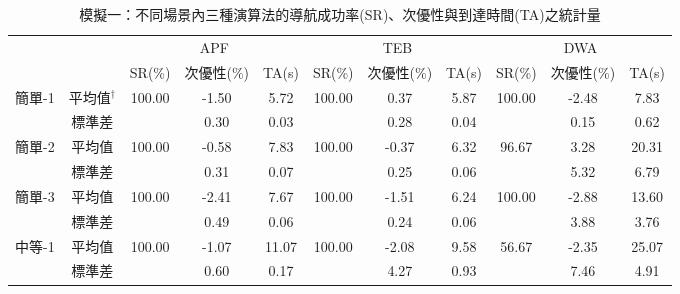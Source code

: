 \begin{sidewaystable}[htbp]
\caption{模擬一：不同場景內三種演算法的導航成功率(SR)、次優性與到達時間(TA)之統計量}
\label{table:sim_1_result_sr_subopt_ta}
\begin{tabular}{ccccccccccc}
\hline
\multicolumn{1}{l}{}  & \multicolumn{1}{l}{} & \multicolumn{3}{c}{APF}                      & \multicolumn{3}{c}{TEB}                      & \multicolumn{3}{c}{DWA}                      \\ \cmidrule(r){3-5} \cmidrule(r){6-8} \cmidrule(r){9-11}
\multicolumn{1}{l}{}  & \multicolumn{1}{l}{} & SR(\%) & 次優性(\%) & \multicolumn{1}{c}{TA(s)} & SR(\%) & 次優性(\%) & \multicolumn{1}{c}{TA(s)} & SR(\%) & 次優性(\%) & \multicolumn{1}{c}{TA(s)} \\ \hline
\multirow{2}{*}{簡單-1} & 平均值$^\dagger$          & 100.00 & -1.50   & 5.72                      & 100.00 & 0.37    & 5.87                      & 100.00 & -2.48   & 7.83                      \\
                      & 標準差                  &        & 0.30    & 0.03                      &        & 0.28    & 0.04                      &        & 0.15    & 0.62                      \\
\multirow{2}{*}{簡單-2} & 平均值                  & 100.00 & -0.58   & 7.83                      & 100.00 & -0.37   & 6.32                      & 96.67  & 3.28    & 20.31                     \\
                      & 標準差                  &        & 0.31    & 0.07                      &        & 0.25    & 0.06                      &        & 5.32    & 6.79                      \\
\multirow{2}{*}{簡單-3} & 平均值                  & 100.00 & -2.41   & 7.67                      & 100.00 & -1.51   & 6.24                      & 100.00 & -2.88   & 13.60                     \\
                      & 標準差                  &        & 0.49    & 0.06                      &        & 0.24    & 0.06                      &        & 3.88    & 3.76                      \\ \hline
\multirow{2}{*}{中等-1} & 平均值                  & 100.00 & -1.07   & 11.07                     & 100.00 & -2.08   & 9.58                      & 56.67  & -2.35   & 25.07                     \\
                      & 標準差                  &        & 0.60    & 0.17                      &        & 4.27    & 0.93                      &        & 7.46    & 4.91                      \\

\end{tabular}
\end{sidewaystable}
